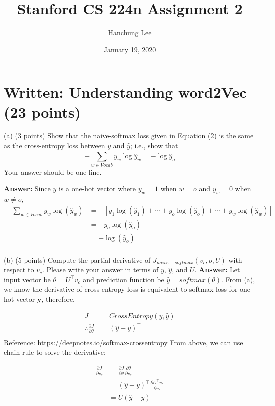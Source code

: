 \documentclass{article}
\title{Stanford CS 224n Assignment 2}
\author{Hanchung Lee}
\date{January 19, 2020}
\begin{document}
\maketitle
\section{Written: Understanding word2Vec (23 points)}
(a) (3 points) Show that the naive-softmax loss given in Equation (2) is the same as the cross-entropy loss
between $y$ and $\hat{y}$; i.e., show that $$-\sum_{w\in{Vocab}}^{} y_w\log{\hat{y}_w} = -\log{\hat{y}_o}$$ 
\indent Your answer should be one line.
\bigbreak

\noindent
\textbf{Answer:} Since $y$ is a one-hot vector where $y_w = 1$ when $w = o$ and $y_w = 0$ when $w \ne o$, 
\begin{align*}
-\sum_{w\in Vocab}y_w\log(\hat{y}_w) & = -[y_1\log(\hat{y}_1) + \cdots + y_o\log(\hat{y}_o) + \cdots + y_w\log(\hat{y}_w)] \\
& = - y_o\log(\hat{y}_o) \\
& = -\log(\hat{y}_o) \\
\end{align*}
\bigbreak

\noindent (b) (5 points) Compute the partial derivative of $J_{naive-softmax}(v_c,o,U)$ with respect to $v_c$.  Please write your answer in terms of $y$, $\hat{y}$, and $U$.
\bigbreak
\textbf{Answer:} Let input vector be $\theta = U^\intercal v_c$ and prediction function be $\hat{y} = softmax(\theta)$. From (a), we know the derivative of cross-entropy loss is equivalent to softmax loss for one hot vector $\mathbf{y}$, therefore,  

\begin{align*}
J &= CrossEntropy(y, \hat{y})\\
\therefore \frac{\partial J}{\partial \theta} &= (\hat{y} - y)^\intercal\\
\end{align*}
\indent Reference: \url{https://deepnotes.io/softmax-crossentropy}
\smallbreak
From above, we can use chain rule to solve the derivative:

\begin{align*}
    \frac{\partial J}{\partial v_c} &= \frac{\partial J}{\partial \theta} \frac{\partial \theta}{\partial v_c} \\
    &= (\hat{y} - y)^\intercal \frac{\partial U^\intercal v_c}{\partial v_c} \\
    &= U (\hat{y} - y)
\end{align*}
\end{document}

